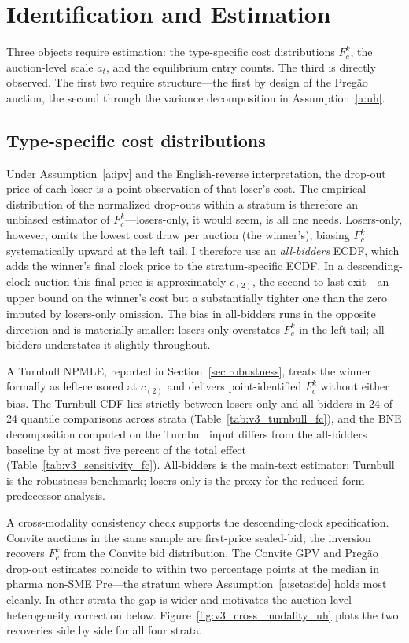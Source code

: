 \section{Identification and Estimation}\label{sec:identification}

Three objects require estimation: the type-specific cost distributions $F_c^k$, the auction-level scale $a_t$, and the equilibrium entry counts. The third is directly observed. The first two require structure---the first by design of the Preg\~ao auction, the second through the variance decomposition in Assumption~\ref{a:uh}.

\subsection{Type-specific cost distributions}

Under Assumption~\ref{a:ipv} and the English-reverse interpretation, the drop-out price of each loser is a point observation of that loser's cost. The empirical distribution of the normalized drop-outs within a stratum is therefore an unbiased estimator of $F_c^k$---losers-only, it would seem, is all one needs. Losers-only, however, omits the lowest cost draw per auction (the winner's), biasing $F_c^k$ systematically upward at the left tail. I therefore use an \emph{all-bidders} ECDF, which adds the winner's final clock price to the stratum-specific ECDF. In a descending-clock auction this final price is approximately $c_{(2)}$, the second-to-last exit---an upper bound on the winner's cost but a substantially tighter one than the zero imputed by losers-only omission. The bias in all-bidders runs in the opposite direction and is materially smaller: losers-only overstates $F_c^k$ in the left tail; all-bidders understates it slightly throughout.

A Turnbull NPMLE, reported in Section~\ref{sec:robustness}, treats the winner formally as left-censored at $c_{(2)}$ and delivers point-identified $F_c^k$ without either bias. The Turnbull CDF lies strictly between losers-only and all-bidders in 24 of 24 quantile comparisons across strata (Table~\ref{tab:v3_turnbull_fc}), and the BNE decomposition computed on the Turnbull input differs from the all-bidders baseline by at most five percent of the total effect (Table~\ref{tab:v3_sensitivity_fc}). All-bidders is the main-text estimator; Turnbull is the robustness benchmark; losers-only is the proxy for the reduced-form predecessor analysis.

A cross-modality consistency check supports the descending-clock specification. Convite auctions in the same sample are first-price sealed-bid; the \citet{gpv2000} inversion recovers $F_c^k$ from the Convite bid distribution. The Convite GPV and Preg\~ao drop-out estimates coincide to within two percentage points at the median in pharma non-SME Pre---the stratum where Assumption~\ref{a:setaside} holds most cleanly. In other strata the gap is wider and motivates the auction-level heterogeneity correction below. Figure~\ref{fig:v3_cross_modality_uh} plots the two recoveries side by side for all four strata.

